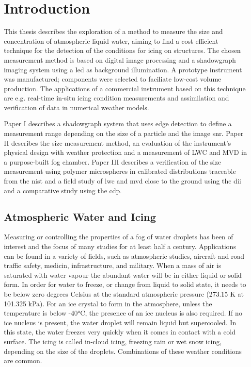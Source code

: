 

\chapter{Introduction}

This thesis describes the exploration of a method to measure the size and concentration of atmospheric liquid water, aiming to find a cost efficient technique for the detection of the conditions for icing on structures. The chosen measurement method is based on digital image processing and a shadowgraph imaging system using a \gls{led} as background illumination. A prototype instrument was manufactured; components were selected to faciliate low-cost volume production. The applications of a commercial instrument based on this technique are e.g. real-time in-situ icing condition measurements and assimilation and verification of data in numerical weather models. 

Paper I describes a shadowgraph system that uses edge detection to define a measurement range depending on the size of a particle and the image \gls{snr}. Paper II describes the size measurement method, an evaluation of the instrument's  physical design with weather protection and a measurement of LWC and MVD in a purpose-built fog chamber. Paper III describes a verification of the size measurement using polymer microspheres in calibrated distributions traceable from the \gls{nist} and a field study of \gls{lwc} and \gls{mvd} close to the ground using the \gls{dii} and a comparative study using the \gls{cdp}.

\section{Atmospheric Water and Icing}

Measuring or controlling the properties of a fog of water droplets has been of interest and the focus of many studies for at least half a century. Applications can be found in a variety of fields, such as atmospheric studies, aircraft and road traffic safety, medicin, infrastructure, and military. When a mass of air is saturated with water vapour the abundant water will be in either liquid or solid form. In order for water to freeze, or change from liquid to solid state, it needs to be below zero degrees Celsius at the standard atmospheric pressure (273.15 K at 101.325 kPa). For an ice crystal to form in the atmosphere, unless the temperature is below -40°C, the presence of an ice nucleus is also required. If no ice nucleus is present, the water droplet will remain liquid but supercooled. In this state, the water freezes very quickly when it comes in contact with a cold surface. The icing is called in-cloud icing, freezing rain or wet snow icing, depending on the size of the droplets. Combinations of these weather conditions are common.

